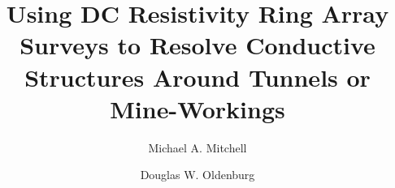 \documentclass[preprint,authoryear,12pt]{elsarticle}
\begin{document}
\begin{frontmatter}



\title{Using DC Resistivity Ring Array Surveys to Resolve Conductive Structures Around Tunnels or Mine-Workings}


\author[1,2]{Michael A. Mitchell}

\author[1]{Douglas W. Oldenburg}

\address[1]{Geophysical Inversion Facility (GIF), \\
Department of Earth, Ocean and Atmospheric Sciences, \\
University of British Columbia, \\
2020-2207 Main Mall, \\
Vancouver, British Columbia \\
Canada, V6T 1Z4}

\address[2]{U.S. Geological Survey, \\
Volcano Science Center, \\
California Volcano Observatory, \\
350 N. Akron Rd., \\
Moffett Field, CA 94035}



\end{frontmatter}
\end{document}

